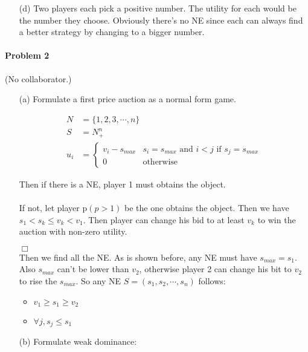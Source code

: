 \documentclass[12pt]{article}
\newenvironment{proof}{\noindent{\em Proof.} \hspace*{1mm}}{
\hspace*{\fill} $\Box$ }
\begin{document}
\begin{itemize}
\item[(d)]
Two players each pick a positive number. The utility for each would be
the number they choose. Obviously there's no NE since each can always
find a better strategy by changing to a bigger number.

\end{itemize}

\bigskip

\paragraph{Problem 2} (No collaborator.)
\begin{itemize}
\item[(a)]
Formulate a first price auction as a normal form game.

\begin{align*}
N &= \{1, 2, 3, \cdots, n\} \\
S &= N_+^n \\
u_i &= \left\{ \begin{array}{ll}
v_i - s_{max}  & s_i = s_{max} \text{ and } i < j
\text{ if } s_j = s_{max}\\
0 & \text{otherwise}
\end{array} \right.
\end{align*}

Then if there is a NE, player 1 must  obtains the object.
\\
\begin{proof}\\
If not, let player p$(p>1)$ be the one obtains the object. Then we
have $s_1<s_k\leq v_k<v_1$. Then player can change his bid to at
least $v_k$ to win the auction with non-zero utility.
\end{proof}
\\
Then we find all the NE. As is shown before, any NE must have
$s_{max}=s_1$. Also $s_{max}$ can't be lower than $v_2$, otherwise
player 2 can change his bit to $v_2$ to rise the $s_{max}$.
So any NE $S=(s_1,s_2,\cdots,s_n)$ follows:
\begin{itemize}
\item $v_1 \geq s_1 \geq v_2$
\item $\forall j, s_j \leq s_1$
\end{itemize}

\item[(b)]
Formulate weak dominance:


\end{itemize}
\end{document}
